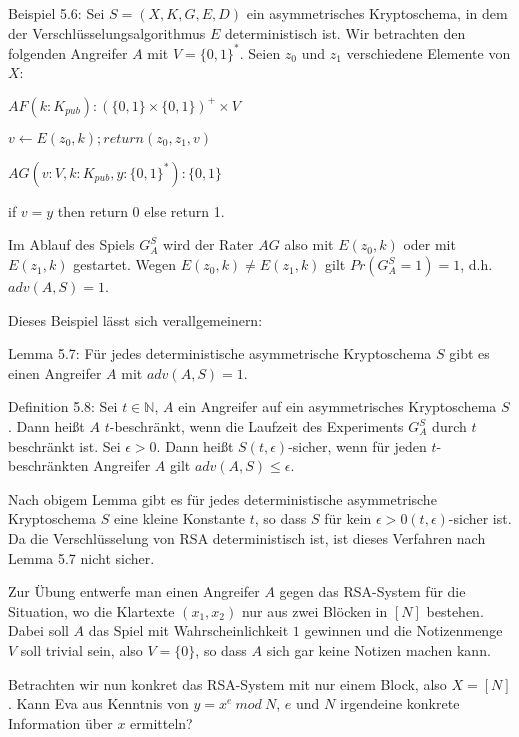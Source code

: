 \documentclass[a4paper]{article}
\begin{document}
\begin{multicols}{3}
        Beispiel 5.6: Sei $S=(X,K,G,E,D)$ ein asymmetrisches Kryptoschema, in dem der Verschlüsselungsalgorithmus $E$ deterministisch ist. Wir betrachten den folgenden Angreifer $A$ mit $V=\{0,1\}^*$. Seien $z_0$ und $z_1$ verschiedene Elemente von $X$:
        \begin{itemize*}
            \item $AF(k:K_{pub}) : (\{0,1\}\times\{0,1\})^+\times V$
            \item $v\leftarrow E(z_0,k);return(z_0,z_1,v)$
            \item $AG(v:V,k:K_{pub},y:\{0,1\}^*):\{0,1\}$
            \item if $v=y$ then return 0 else return 1.
            \item Im Ablauf des Spiels $G^S_A$ wird der Rater $AG$ also mit $E(z_0,k)$ oder mit $E(z_1,k)$ gestartet. Wegen $E(z_0,k)\not=E(z_1,k)$ gilt $Pr(G^S_A=1)=1$, d.h. $adv(A,S)=1$.
        \end{itemize*}

        Dieses Beispiel lässt sich verallgemeinern:

        Lemma 5.7: Für jedes deterministische asymmetrische Kryptoschema $S$ gibt es einen Angreifer $A$ mit $adv(A,S) = 1$.

        Definition 5.8: Sei $t\in\mathbb{N}$, $A$ ein Angreifer auf ein asymmetrisches Kryptoschema $S$. Dann heißt $A$ $t$-beschränkt, wenn die Laufzeit des Experiments $G^S_A$ durch $t$ beschränkt ist.
        Sei $\epsilon >0$. Dann heißt $S(t,\epsilon)$-sicher, wenn für jeden $t$-beschränkten Angreifer $A$ gilt $adv(A,S)\leq \epsilon$.

        Nach obigem Lemma gibt es für jedes deterministische asymmetrische Kryptoschema $S$ eine kleine Konstante $t$, so dass $S$ für kein $\epsilon >0 (t,\epsilon)$-sicher ist. Da die Verschlüsselung von RSA deterministisch ist, ist dieses Verfahren nach Lemma 5.7 nicht sicher.

        Zur Übung entwerfe man einen Angreifer $A$ gegen das RSA-System für die Situation, wo die Klartexte $(x_1,x_2)$ nur aus zwei Blöcken in $[N]$ bestehen. Dabei soll $A$ das Spiel mit Wahrscheinlichkeit $1$ gewinnen und die Notizenmenge $V$ soll trivial sein, also $V=\{0\}$, so dass $A$ sich gar keine Notizen machen kann.

        Betrachten wir nun konkret das RSA-System mit nur einem Block, also $X=[N]$. Kann Eva aus Kenntnis von $y=x^e\ mod\ N$, $e$ und $N$ irgendeine konkrete Information über $x$ ermitteln?


\end{multicols}
\end{document}
